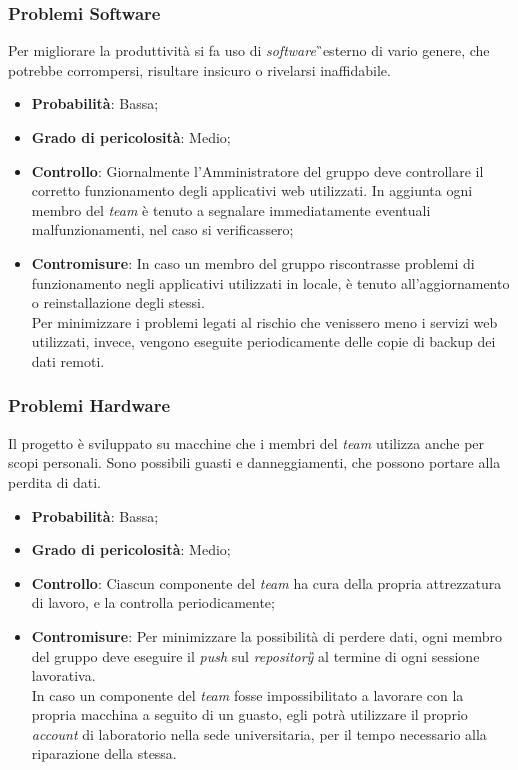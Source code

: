 \subsubsection{Problemi Software}
\label{sec:PSW}
Per migliorare la produttività si fa uso di \textit{software}\G\ esterno di vario genere, che potrebbe corrompersi, risultare insicuro o rivelarsi inaffidabile.
\begin{itemize}
\item \textbf{Probabilità}: Bassa;
\item \textbf{Grado di pericolosità}: Medio;
\item \textbf{Controllo}: Giornalmente l'Amministratore del gruppo deve controllare il corretto funzionamento degli applicativi web utilizzati. In aggiunta ogni membro del \textit{team} è tenuto a segnalare immediatamente eventuali malfunzionamenti, nel caso si verificassero;
\item \textbf{Contromisure}: In caso un membro del gruppo riscontrasse problemi di funzionamento negli applicativi utilizzati in locale, è tenuto all'aggiornamento o reinstallazione degli stessi. \\ 
Per minimizzare i problemi legati al rischio che venissero meno i servizi web utilizzati, invece, vengono eseguite periodicamente delle copie di backup dei dati remoti.
\end{itemize}

\subsubsection{Problemi Hardware}
\label{sec:PHW}
Il progetto è sviluppato su macchine che i membri del \textit{team} utilizza anche per scopi personali. Sono possibili guasti e danneggiamenti, che possono portare alla perdita di dati.
\begin{itemize}
\item \textbf{Probabilità}: Bassa;
\item \textbf{Grado di pericolosità}: Medio;
\item \textbf{Controllo}: Ciascun componente del \textit{team} ha cura della propria attrezzatura di lavoro, e la controlla periodicamente;
\item \textbf{Contromisure}: Per minimizzare la possibilità di perdere dati, ogni membro del gruppo deve eseguire il \textit{push} sul \textit{repository\G} al termine di ogni sessione lavorativa. \\
In caso un componente del \textit{team} fosse impossibilitato a lavorare con la propria macchina a seguito di un guasto, egli potrà utilizzare il proprio \textit{account} di laboratorio nella sede universitaria, per il tempo necessario alla riparazione della stessa.
\end{itemize}

